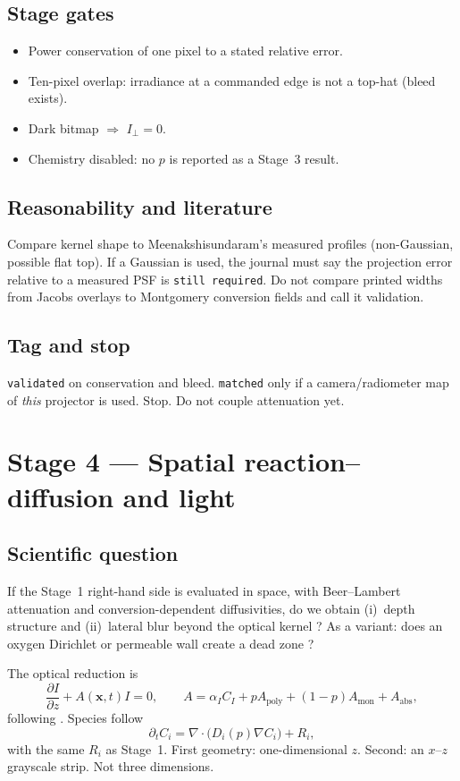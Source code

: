 \documentclass[11pt,a4paper]{article}
\newcommand{\tagvalid}{\texttt{validated}}
\newcommand{\tagmatch}{\texttt{matched}}
\newcommand{\stillreq}{\texttt{still required}}
\begin{document}
\subsection{Stage gates}
\begin{itemize}
  \item Power conservation of one pixel to a stated relative error.
  \item Ten-pixel overlap: irradiance at a commanded edge is not a top-hat (bleed exists).
  \item Dark bitmap $\Rightarrow$ $I_\perp=0$.
  \item Chemistry disabled: no $p$ is reported as a Stage~3 result.
\end{itemize}

\subsection{Reasonability and literature}
Compare kernel shape to Meenakshisundaram's measured profiles (non-Gaussian, possible flat top).
If a Gaussian is used, the journal must say the projection error relative to a measured PSF is \stillreq.
Do not compare printed widths from Jacobs overlays to Montgomery conversion fields and call it validation.

\subsection{Tag and stop}
\tagvalid{} on conservation and bleed.
\tagmatch{} only if a camera/radiometer map of \emph{this} projector is used.
Stop. Do not couple attenuation yet.

\section{Stage 4 --- Spatial reaction--diffusion and light}

\subsection{Scientific question}
If the Stage~1 right-hand side is evaluated in space, with Beer--Lambert attenuation and conversion-dependent diffusivities, do we obtain (i)~depth structure and (ii)~lateral blur beyond the optical kernel \citep{Montgomery2022}?
As a variant: does an oxygen Dirichlet or permeable wall create a dead zone \citep{Dendukuri2008}?

The optical reduction is
\begin{equation}
  \frac{\partial I}{\partial z}+A(\mathbf{x},t)I=0,\qquad
  A=\alpha_I C_I + p A_{\mathrm{poly}}+(1-p)A_{\mathrm{mon}}+A_{\mathrm{abs}},
  \label{eq:beer}
\end{equation}
following \citet{Montgomery2022}.
Species follow
\begin{equation}
  \partial_t C_i = \nabla\cdot\bigl(D_i(p)\nabla C_i\bigr)+R_i,
\end{equation}
with the same $R_i$ as Stage~1.
First geometry: one-dimensional $z$.
Second: an $x$--$z$ grayscale strip.
Not three dimensions.
\end{document}
